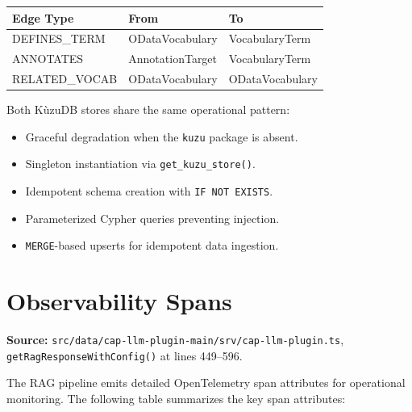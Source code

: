 \documentclass[11pt]{article}
\begin{document}
\begin{center}
\begin{tabular}{lll}
\toprule
\textbf{Edge Type} & \textbf{From} & \textbf{To} \\
\midrule
DEFINES\_TERM & ODataVocabulary & VocabularyTerm \\
ANNOTATES & AnnotationTarget & VocabularyTerm \\
RELATED\_VOCAB & ODataVocabulary & ODataVocabulary \\
\bottomrule
\end{tabular}
\end{center}

Both KùzuDB stores share the same operational pattern:
\begin{itemize}
  \item Graceful degradation when the \texttt{kuzu} package is absent.
  \item Singleton instantiation via \texttt{get\_kuzu\_store()}.
  \item Idempotent schema creation with \texttt{IF NOT EXISTS}.
  \item Parameterized Cypher queries preventing injection.
  \item \texttt{MERGE}-based upserts for idempotent data ingestion.
\end{itemize}

\section{Observability Spans}
\label{sec:observability}

\noindent\textbf{Source:}
\texttt{src/data/cap-llm-plugin-main/srv/cap-llm-plugin.ts},
\texttt{getRagResponseWithConfig()} at lines 449--596.

The RAG pipeline emits detailed OpenTelemetry span attributes for operational
monitoring. The following table summarizes the key span attributes:
\end{document}
